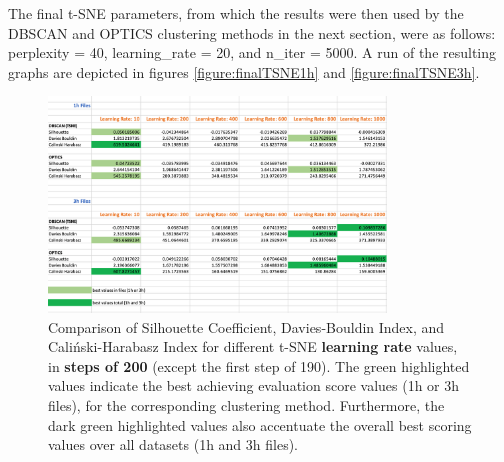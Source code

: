 The final t-SNE parameters, from which the results were then used by the DBSCAN and OPTICS clustering methods in the next section, were as follows: perplexity = 40, learning\_rate = 20, and n\_iter = 5000. A run of the resulting graphs are depicted in figures \ref{figure:finalTSNE1h} and \ref{figure:finalTSNE3h}.


\begin{figure}
  \centering
  \includegraphics[width=0.8\textwidth]{./images/tsneParametersTest/learningRate/learningRateEvaluationScores.png}
  \caption{Comparison of Silhouette Coefficient, Davies-Bouldin Index, and Caliński-Harabasz Index for different t-SNE \textbf{learning rate} values, in \textbf{steps of 200} (except the first step of 190). The green highlighted values indicate the best achieving evaluation score values (1h or 3h files), for the corresponding clustering method. Furthermore, the dark green highlighted values also accentuate the overall best scoring values over all datasets (1h and 3h files).}
  \label{figure:learningRateEvaluationScores}
\end{figure}


